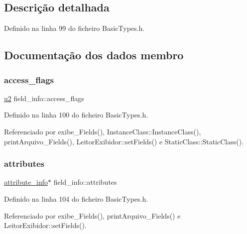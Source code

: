 \subsection{Descrição detalhada}


Definido na linha 99 do ficheiro Basic\+Types.\+h.



\subsection{Documentação dos dados membro}
\mbox{\label{structfield__info_aa622dc9a5b5353d2f3eb2f416dacab4b}} 
\subsubsection{\texorpdfstring{access\+\_\+flags}{access\_flags}}
{\footnotesize\ttfamily \hyperlink{BasicTypes_8h_a732cde1300aafb73b0ea6c2558a7a54f}{u2} field\+\_\+info\+::access\+\_\+flags}



Definido na linha 100 do ficheiro Basic\+Types.\+h.



Referenciado por exibe\+\_\+\+Fields(), Instance\+Class\+::\+Instance\+Class(), print\+Arquivo\+\_\+\+Fields(), Leitor\+Exibidor\+::set\+Fields() e Static\+Class\+::\+Static\+Class().

\mbox{\label{structfield__info_afdda114944ae5eaae78c237f99257108}} 
\subsubsection{\texorpdfstring{attributes}{attributes}}
{\footnotesize\ttfamily \hyperlink{structattribute__info}{attribute\+\_\+info}$\ast$ field\+\_\+info\+::attributes}



Definido na linha 104 do ficheiro Basic\+Types.\+h.



Referenciado por exibe\+\_\+\+Fields(), print\+Arquivo\+\_\+\+Fields() e Leitor\+Exibidor\+::set\+Fields().

